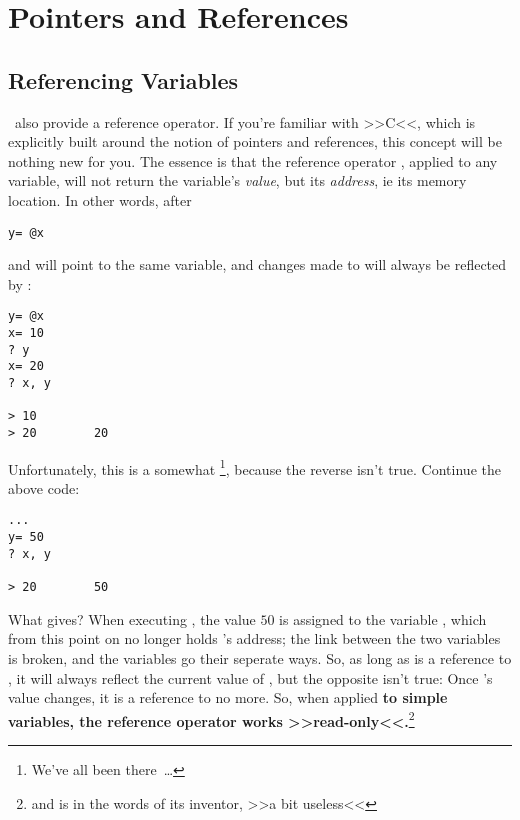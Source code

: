 \absatz


\section{Pointers and References \label{referenceOperator}}

\subsection{Referencing Variables}

\SB\ also provide a reference operator. If you're familiar with >>C<<,
which is explicitly built around the notion of pointers and references,
this concept will be nothing new for you. The essence is that the
reference operator \Co{\at}, applied to any variable, will not return the
variable's \emph{value}, but its \emph{address}, ie its memory location.
  In other words,
after

\begin{lstlisting}
y= @x
\end{lstlisting}

 and  will point to the same variable, and changes made to
 will always be reflected by :

\begin{lstlisting}
y= @x
x= 10
? y
x= 20
? x, y

> 10
> 20		20
\end{lstlisting}

Unfortunately, this is a somewhat \footnote{We've all been
there~\ldots}, because the reverse isn't true. Continue the above code:

\begin{lstlisting}
...
y= 50
? x, y

> 20		50
\end{lstlisting}

What gives? When executing , the value $50$ is assigned to
the variable , which from this point on no longer holds 's
address; the link between the two variables is broken, and the variables
go their seperate ways. So, as long as  is a reference to ,
it will always reflect the current value of , but the opposite
isn't true: Once 's value changes, it is a reference to  no
more. So, when applied \textbf{to simple variables, the reference
operator works >>read-only<<.}\footnote{and is in the words of its
inventor, >>a bit useless<<}

